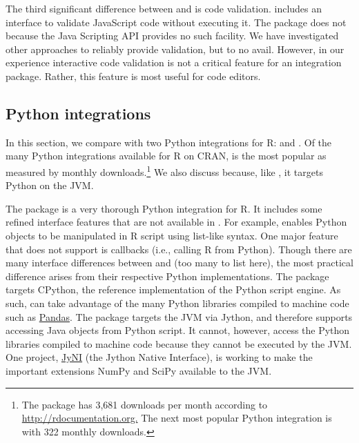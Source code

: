 The third significant difference between  and  is code validation.  includes an interface to validate JavaScript code without executing it. The  package does not because the Java Scripting API provides no such facility. We have investigated other approaches to reliably provide validation, but to no avail. However, in our experience interactive code validation is not a critical feature for an integration package. Rather, this feature is most useful for code editors.

\subsection{Python integrations}

In this section, we compare  with two Python integrations for R:  and . Of the many Python integrations available for R on CRAN,  is the most popular as measured by monthly downloads.\footnote{The  package has 3,681 downloads per month according to \href{http://rdocumentation.org}{http://rdocumentation.org.} The next most popular Python integration is  with 322 monthly downloads.} We also discuss  because, like , it targets Python on the JVM.

The  package is a very thorough Python integration for R. It includes some refined interface features that are not available in . For example,  enables Python objects to be manipulated in R script using list-like syntax. One major  feature that  does not support is callbacks (i.e., calling R from Python). Though there are many interface differences between  and  (too many to list here), the most practical difference arises from their respective Python implementations. The  package targets CPython, the reference implementation of the Python script engine. As such,  can take advantage of the many Python libraries compiled to machine code such as \href{https://pandas.pydata.org/}{Pandas}. The  package targets the JVM via Jython, and therefore supports accessing Java objects from Python script. It cannot, however, access the Python libraries compiled to machine code because they cannot be executed by the JVM. One project, \href{http://www.jyni.org/}{JyNI} (the Jython Native Interface), is working to make the important extensions NumPy and SciPy available to the JVM. %

